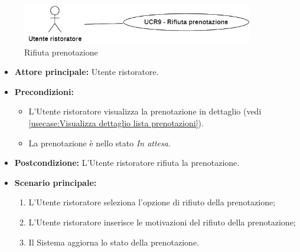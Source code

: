 \label{usecase:Rifiuta prenotazione}

\begin{figure}[h]
	\centering
	\includegraphics[width=0.9\textwidth]{./uml/UCR9.png} 
	\caption{Rifiuta prenotazione}
	\label{fig:UCR9}
  \end{figure}

\begin{itemize}
	\item \textbf{Attore principale:} Utente ristoratore.

	\item \textbf{Precondizioni:}
	      \begin{itemize}
		      \item L'Utente ristoratore visualizza la prenotazione in dettaglio (vedi \autoref{usecase:Visualizza dettaglio lista prenotazioni}).
		      \item La prenotazione è nello stato \textit{In attesa}.
	      \end{itemize}

	\item \textbf{Postcondizione:} L'Utente ristoratore rifiuta la prenotazione.



	\item \textbf{Scenario principale:}
	      \begin{enumerate}
		      \item L'Utente ristoratore seleziona l'opzione di rifiuto della prenotazione;

		      \item L'Utente ristoratore inserisce le motivazioni del rifiuto della prenotazione;

		      \item Il Sistema aggiorna lo stato della prenotazione.

	      \end{enumerate}
\end{itemize}
